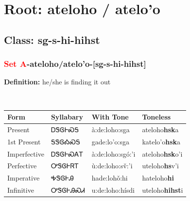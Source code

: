\needspace{4in}
\section*{Root: ateloho / atelo'o}
\nopagebreak
{}
\needspace{3in}
\subsection*{Class: sg-s-hi-hihst}
\nopagebreak
\needspace{2in}
\subsubsection*{\textcolor{Red}{Set A}{-}\textbf{ateloho/atelo'o}{-}[sg-s-hi-hihst]}
\nopagebreak
\textbf{Definition: } he/she is finding it out
\\[0.5em]
\begin{tabularx}{\textwidth}{l X X X}%
\toprule%
\textbf{Form}&\textbf{Syllabary}&\textbf{With Tone}&\textbf{Toneless}\\%
\midrule%
Present&ᎠᏕᎶᎰᏍᎦ&à:de:loho:sga&ateloho\textbf{hsk}a\\%
1st Present&ᎦᏕᎶᎣᏍᎦ&gade:lo’o:sga&katelo'o\textbf{hsk}a\\%
Imperfective&ᎠᏕᎶᎰᏍᎪᎢ&à:de:loho:sgó:’i&ateloho\textbf{hsk}o'i\\%
Perfective&ᎤᏕᎶᎰᏒᎢ&ù:de:loho:sv̌:’i&uteloho\textbf{hs}v'i\\%
Imperative&ᎭᏕᎶᎰᎯ&hade:lohǒ:hi&hateloho\textbf{hi}\\%
Infinitive&ᎤᏕᎶᎰᎯᏍᏗ&u:de:loho:hísdi&uteloho\textbf{hihst}i\\%
\bottomrule%
\end{tabularx}
\\[1em]